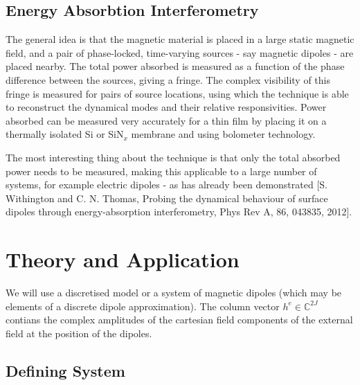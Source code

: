 \documentclass[12pt,twoside,a4paper,english]{article}
\begin{document}
\subsection{Energy Absorbtion Interferometry}
The general idea is that the magnetic material is placed in a large static magnetic field, and a pair of phase-locked, time-varying sources - say magnetic dipoles - are placed nearby.
The total power absorbed is measured as a function of the phase difference between the sources, giving a fringe. The complex visibility of this fringe is measured for pairs of source locations, using which the technique is able to reconstruct the dynamical modes and their relative responsivities.
Power absorbed can be measured very accurately for a thin film by placing it on a thermally isolated Si or SiN$_x$ membrane and using bolometer technology.

The most interesting thing about the technique is that only the total absorbed power needs to be measured, making this applicable to a large number of systems, for example electric dipoles - as has already been demonstrated [S. Withington and C. N. Thomas, Probing the dynamical behaviour of surface dipoles through energy-absorption interferometry, Phys Rev A, 86, 043835, 2012].


\section{Theory and Application}

We will use a discretised model or a system of magnetic dipoles (which may be elements of a discrete dipole approximation). The column vector \(h^e \in \mathbb{C}^{2J} \) contians the complex amplitudes of the cartesian field components of the external field at the position of the dipoles.

\subsection{Defining System}
\end{document}
